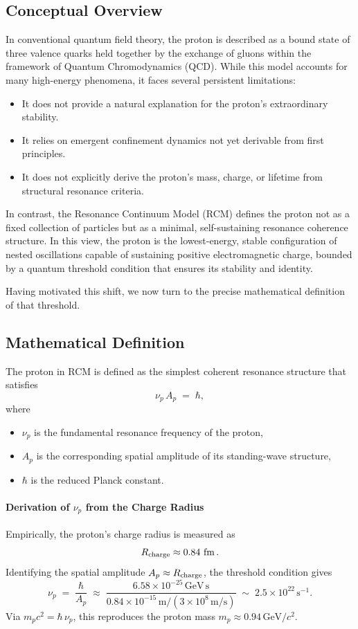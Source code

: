 \subsection{Conceptual Overview}
In conventional quantum field theory, the proton is described as a bound state of three valence quarks held together by the exchange of gluons within the framework of Quantum Chromodynamics (QCD).  While this model accounts for many high-energy phenomena, it faces several persistent limitations:
\begin{itemize}
  \item It does not provide a natural explanation for the proton’s extraordinary stability.
  \item It relies on emergent confinement dynamics not yet derivable from first principles.
  \item It does not explicitly derive the proton’s mass, charge, or lifetime from structural resonance criteria.
\end{itemize}

In contrast, the Resonance Continuum Model (RCM) defines the proton not as a fixed collection of particles but as a minimal, self-sustaining resonance coherence structure.  In this view, the proton is the lowest-energy, stable configuration of nested oscillations capable of sustaining positive electromagnetic charge, bounded by a quantum threshold condition that ensures its stability and identity.

\bigskip
Having motivated this shift, we now turn to the precise mathematical definition of that threshold.

\subsection{Mathematical Definition}
The proton in RCM is defined as the simplest coherent resonance structure that satisfies
\[
\nu_p\,A_p \;=\;\hbar,
\]
where
\begin{itemize}
  \item \(\nu_p\) is the fundamental resonance frequency of the proton,
  \item \(A_p\) is the corresponding spatial amplitude of its standing-wave structure,
  \item \(\hbar\) is the reduced Planck constant.
\end{itemize}

\paragraph{Derivation of \(\nu_p\) from the Charge Radius}  
Empirically, the proton’s charge radius is measured as 
\[
R_{\rm charge}\approx0.84~\mathrm{fm}\,.
\]
Identifying the spatial amplitude \(A_p\approx R_{\rm charge}\), the threshold condition gives
\[
\nu_p \;=\;\frac{\hbar}{A_p}
\;\approx\;
\frac{6.58\times10^{-25}\,\mathrm{GeV\,s}}
     {0.84\times10^{-15}\,\mathrm{m}/(3\times10^8\,\mathrm{m/s})}
\;\sim\;2.5\times10^{22}\,\mathrm{s^{-1}}.
\]
Via \(m_p c^2 = \hbar\,\nu_p\), this reproduces the proton mass \(m_p\approx0.94\,\mathrm{GeV}/c^2\).


